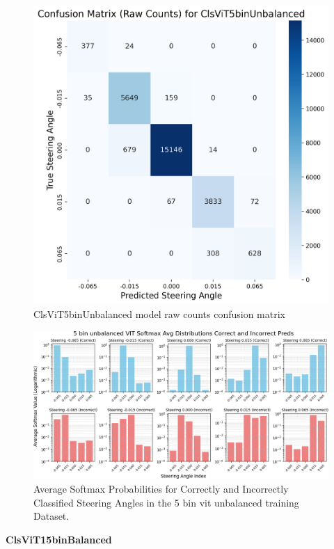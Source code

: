\begin{figure}[H]
\centering
\includegraphics[width=0.65\linewidth]{Figures/Results/cm_raw_ClsViT5binUnbalanced.png}
\caption{ClsViT5binUnbalanced model raw counts confusion matrix}
\label{fig:cm_raw_ClsViT5binUnbalanced}
\end{figure}

\begin{figure}[H]
    \centering
    \includegraphics[width=1\linewidth]{Figures/Results/5_bins_vit_softmax_dist_plot_unbalanced.png}
    \caption{Average Softmax Probabilities for Correctly and Incorrectly Classified Steering Angles in the 5 bin vit unbalanced training Dataset.}
    \label{fig:5_bins_vit_softmax_dist_unbalanced}
\end{figure}


\textbf{ClsViT15binBalanced}

